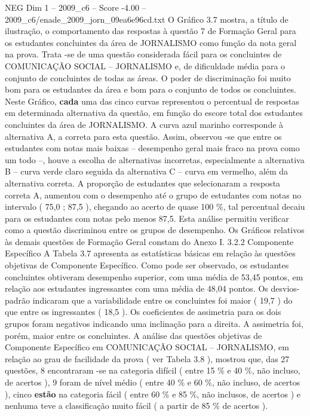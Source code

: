 \begin{textsample}{NEG Dim 1 – 2009\_c6 – Score -4.00 – 2009\_c6/enade\_2009\_jorn\_09ea6e96cd.txt}
O Gráfico 3.7 mostra, a título de ilustração, o comportamento das respostas à questão 7 de Formação Geral para os estudantes concluintes da área de JORNALISMO como função da nota geral na prova.
Trata -se de uma questão considerada fácil para os concluintes de COMUNICAÇÃO SOCIAL – JORNALISMO e, de dificuldade média para o conjunto de concluintes de todas as áreas.
O poder de discriminação foi muito bom para os estudantes da área e bom para o conjunto de todos os concluintes.
Neste Gráfico, \textbf{cada} uma das cinco curvas representou o percentual de respostas em determinada alternativa da questão, em função do escore total dos estudantes concluintes da área de JORNALISMO.
A curva azul marinho corresponde à alternativa A, a correta para esta questão.
Assim, observou -se que entre os estudantes com notas mais baixas – desempenho geral mais fraco na prova como um todo –, houve a escolha de alternativas incorretas, especialmente a alternativa B – curva verde claro seguida da alternativa C – curva em vermelho, além da alternativa correta.
A proporção de estudantes que selecionaram a resposta correta A, aumentou com o desempenho até o grupo de estudantes com notas no intervalo ( 75,0 ; 87,5 ), chegando ao acerto de quase 100 \%, tal percentual decaiu para os estudantes com notas pelo menos 87,5.
Esta análise permitiu verificar como a questão discriminou entre os grupos de desempenho.
Os Gráficos relativos às demais questões de Formação Geral constam do Anexo I. 3.2.2 Componente Específico A Tabela 3.7 apresenta as estatísticas básicas em relação às questões objetivas de Componente Específico.
Como pode ser observado, os estudantes concluintes obtiveram desempenho superior, com uma média de 53,45 pontos, em relação aos estudantes ingressantes com uma média de 48,04 pontos.
Os desvios-padrão indicaram que a variabilidade entre os concluintes foi maior ( 19,7 ) do que entre os ingressantes ( 18,5 ).
Os coeficientes de assimetria para os dois grupos foram negativos indicando uma inclinação para a direita.
A assimetria foi, porém, maior entre os concluintes.
A análise das questões objetivas de Componente Específico em COMUNICAÇÃO SOCIAL – JORNALISMO, em relação ao grau de facilidade da prova ( ver Tabela 3.8 ), mostrou que, das 27 questões, 8 encontraram -se na categoria difícil ( entre 15 \% e 40 \%, não incluso, de acertos ), 9 foram de nível médio ( entre 40 \% e 60 \%, não incluso, de acertos ), cinco \textbf{estão} na categoria fácil ( entre 60 \% e 85 \%, não inclusos, de acertos ) e nenhuma teve a classificação muito fácil ( a partir de 85 \% de acertos ).

\end{textsample}
